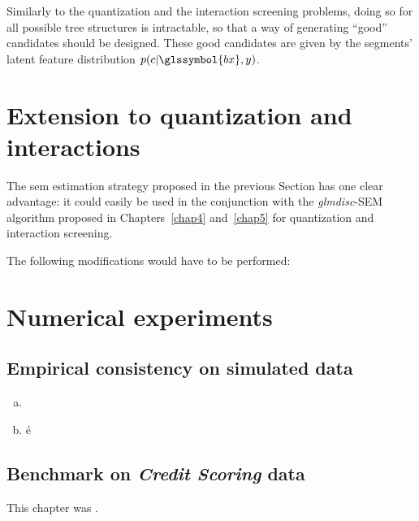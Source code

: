 Similarly to the quantization and the interaction screening problems, doing so for all possible tree structures is intractable, so that a way of generating ``good'' candidates should be designed. These good candidates are given by the segments' latent feature distribution $p(c | \glssymbol{bx}, y)$.


\section{Extension to quantization and interactions}

The \gls{sem} estimation strategy proposed in the previous Section has one clear advantage: it could easily be used in the conjunction with the \textit{glmdisc}-SEM algorithm proposed in Chapters~\ref{chap4} and~\ref{chap5} for quantization and interaction screening.

The following modifications would have to be performed:

\section{Numerical experiments} \label{sec:num_exp}



\subsection{Empirical consistency on simulated data} \label{subsec:num_sim}


\begin{enumerate}[(a)]
\item 
\item é
\end{enumerate}

\subsection{Benchmark on \textit{Credit Scoring} data}




\bigskip

This chapter was .


\printbibliography[heading=subbibliography, title=References of Chapter 5]

